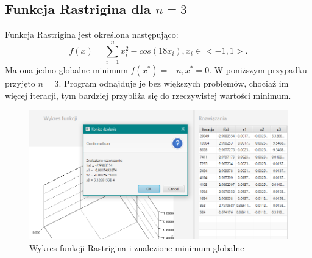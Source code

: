 \documentclass[10pt, a4paper]{article}
\begin{document}
\pagebreak 

\subsection{Funkcja Rastrigina dla $n = 3$ }
\label{subsec:rastrigin}
Funkcja Rastrigina jest określona następująco: $$f(x) = \sum_{i=1}^{n} x_{i}^2-cos(18x_{i}), x_{i} \in <-1,1>.$$ Ma ona jedno globalne minimum $f(x^*) = -n, x^* = 0.$ W poniższym przypadku przyjęto $n=3$. Program odnajduje je bez większych problemów, chociaż im więcej iteracji, tym bardziej przybliża się do rzeczywistej wartości minimum.
\begin{figure}[htbp] 
	\begin{minipage}[b]{1\textwidth}
		\centering
		\includegraphics[width=\linewidth]{images/Rastrigine.PNG} 
	\end{minipage}
	\caption{Wykres funkcji Rastrigina i znalezione minimum globalne}
	\label{fig:23}
\end{figure}
\end{document}
